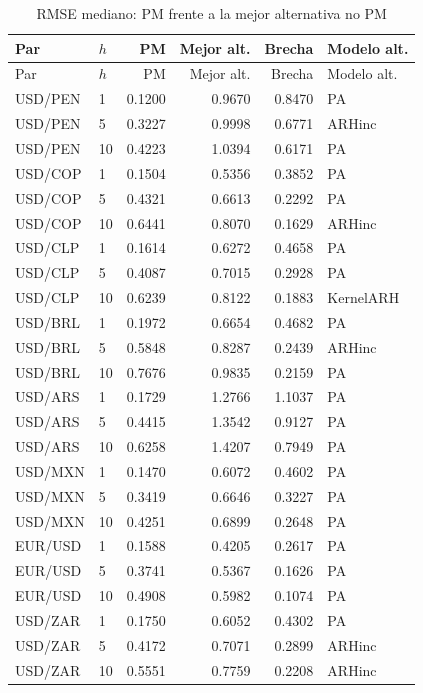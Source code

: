 \documentclass[a4paper,11pt]{article}
\begin{document}
\begin{longtable}{llrrrl}
\caption{RMSE mediano: PM frente a la mejor alternativa no PM}
\label{tab:rmse_best}\\
\toprule
Par & \(h\) & PM & Mejor alt. & Brecha & Modelo alt. \\
\midrule
\endfirsthead
\toprule
Par & \(h\) & PM & Mejor alt. & Brecha & Modelo alt. \\
\midrule
\endhead
USD/PEN & 1 & 0.1200 & 0.9670 & 0.8470 & PA \\
USD/PEN & 5 & 0.3227 & 0.9998 & 0.6771 & ARHinc \\
USD/PEN & 10 & 0.4223 & 1.0394 & 0.6171 & PA \\
USD/COP & 1 & 0.1504 & 0.5356 & 0.3852 & PA \\
USD/COP & 5 & 0.4321 & 0.6613 & 0.2292 & PA \\
USD/COP & 10 & 0.6441 & 0.8070 & 0.1629 & ARHinc \\
USD/CLP & 1 & 0.1614 & 0.6272 & 0.4658 & PA \\
USD/CLP & 5 & 0.4087 & 0.7015 & 0.2928 & PA \\
USD/CLP & 10 & 0.6239 & 0.8122 & 0.1883 & KernelARH \\
USD/BRL & 1 & 0.1972 & 0.6654 & 0.4682 & PA \\
USD/BRL & 5 & 0.5848 & 0.8287 & 0.2439 & ARHinc \\
USD/BRL & 10 & 0.7676 & 0.9835 & 0.2159 & PA \\
USD/ARS & 1 & 0.1729 & 1.2766 & 1.1037 & PA \\
USD/ARS & 5 & 0.4415 & 1.3542 & 0.9127 & PA \\
USD/ARS & 10 & 0.6258 & 1.4207 & 0.7949 & PA \\
USD/MXN & 1 & 0.1470 & 0.6072 & 0.4602 & PA \\
USD/MXN & 5 & 0.3419 & 0.6646 & 0.3227 & PA \\
USD/MXN & 10 & 0.4251 & 0.6899 & 0.2648 & PA \\
EUR/USD & 1 & 0.1588 & 0.4205 & 0.2617 & PA \\
EUR/USD & 5 & 0.3741 & 0.5367 & 0.1626 & PA \\
EUR/USD & 10 & 0.4908 & 0.5982 & 0.1074 & PA \\
USD/ZAR & 1 & 0.1750 & 0.6052 & 0.4302 & PA \\
USD/ZAR & 5 & 0.4172 & 0.7071 & 0.2899 & ARHinc \\
USD/ZAR & 10 & 0.5551 & 0.7759 & 0.2208 & ARHinc \\
\bottomrule
\end{longtable}
\end{document}
